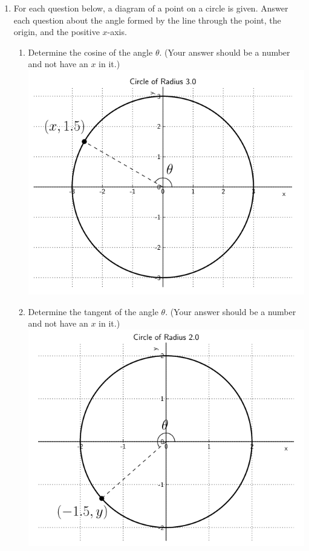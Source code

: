 \documentclass[11pt]{article}
\begin{document}
\begin{enumerate}
\item For each question below, a diagram of a point on a circle is given.  Answer each question about the angle formed by the line through the point, the origin, and the positive $x$-axis.
\begin{enumerate}
\item Determine the cosine of the angle $\theta$.  (Your answer should be a number and not have an $x$ in it.)\\
\includegraphics[scale=.7]{circle1}
\item Determine the tangent of the angle $\theta$.  (Your answer should be a number and not have an $x$ in it.)\\
\includegraphics[scale=.7]{circle2}\\


\end{enumerate}
\end{enumerate}
\end{document}
